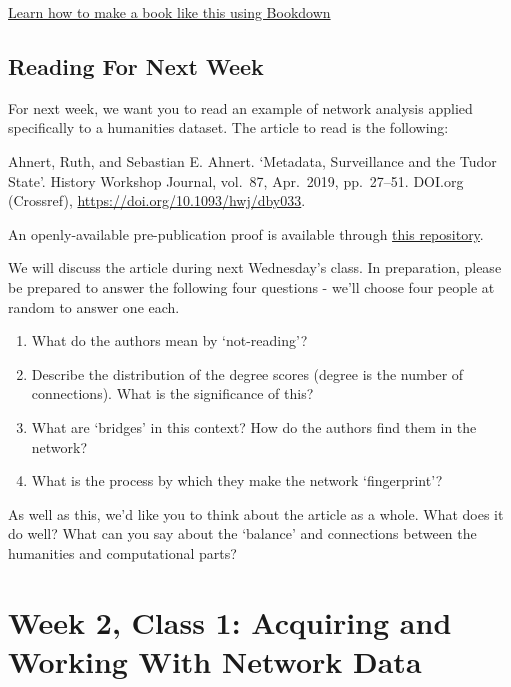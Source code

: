 \documentclass[
]{book}
\begin{document}
\href{https://bookdown.org/yihui/bookdown/introduction.html}{Learn how to make a book like this using Bookdown}

\hypertarget{reading-for-next-week}{%
\section{Reading For Next Week}\label{reading-for-next-week}}

For next week, we want you to read an example of network analysis applied specifically to a humanities dataset. The article to read is the following:

Ahnert, Ruth, and Sebastian E. Ahnert. `Metadata, Surveillance and the Tudor State'. History Workshop Journal, vol.~87, Apr.~2019, pp.~27--51. DOI.org (Crossref), \url{https://doi.org/10.1093/hwj/dby033}.

An openly-available pre-publication proof is available through \href{https://www.repository.cam.ac.uk/bitstream/handle/1810/314971/Ahnert\%20and\%20Ahnert_Metadata\%20Surveillance\%20and\%20the\%20Tudor\%20State_HWJ.pdf?sequence=1}{this repository}.

We will discuss the article during next Wednesday's class. In preparation, please be prepared to answer the following four questions - we'll choose four people at random to answer one each.

\begin{enumerate}
\def\labelenumi{\arabic{enumi})}
\item
  What do the authors mean by `not-reading'?
\item
  Describe the distribution of the degree scores (degree is the number of connections). What is the significance of this?
\item
  What are `bridges' in this context? How do the authors find them in the network?
\item
  What is the process by which they make the network `fingerprint'?
\end{enumerate}

As well as this, we'd like you to think about the article as a whole. What does it do well? What can you say about the `balance' and connections between the humanities and computational parts?

\hypertarget{week-2-class-1-acquiring-and-working-with-network-data}{%
\chapter{Week 2, Class 1: Acquiring and Working With Network Data}\label{week-2-class-1-acquiring-and-working-with-network-data}}
\end{document}

